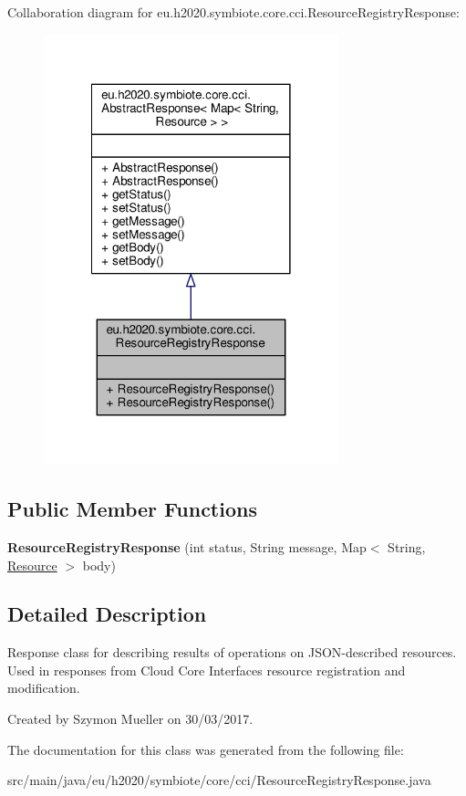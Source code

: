 Collaboration diagram for eu.\+h2020.\+symbiote.\+core.\+cci.\+Resource\+Registry\+Response\+:\nopagebreak
\begin{figure}[H]
\begin{center}
\leavevmode
\includegraphics[width=242pt]{classeu_1_1h2020_1_1symbiote_1_1core_1_1cci_1_1ResourceRegistryResponse__coll__graph}
\end{center}
\end{figure}
\subsection*{Public Member Functions}
\begin{DoxyCompactItemize}
\item 
\mbox{\label{classeu_1_1h2020_1_1symbiote_1_1core_1_1cci_1_1ResourceRegistryResponse_ad1ee4fc9d2dd553ac5badd860adb2999}} 
{\bfseries Resource\+Registry\+Response} (int status, String message, Map$<$ String, \hyperlink{classeu_1_1h2020_1_1symbiote_1_1model_1_1cim_1_1Resource}{Resource} $>$ body)
\end{DoxyCompactItemize}


\subsection{Detailed Description}
Response class for describing results of operations on J\+S\+O\+N-\/described resources. Used in responses from Cloud Core Interface\textquotesingle{}s resource registration and modification. 

Created by Szymon Mueller on 30/03/2017. 

The documentation for this class was generated from the following file\+:\begin{DoxyCompactItemize}
\item 
src/main/java/eu/h2020/symbiote/core/cci/Resource\+Registry\+Response.\+java\end{DoxyCompactItemize}
